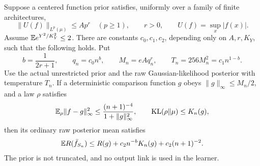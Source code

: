\begin{theorem}
\label{thm:raw-tail-oracle}
Suppose a centered function prior satisfies, uniformly over a family
of finite architectures,
\[
 \|U(f)\|_{L^p(\mu)}\le A p^r\quad(p\ge1),\qquad r>0,
 \qquad U(f)=\sup_x|f(x)|.
\]
Assume $\mathbb E e^{Y^2/K_Y^2}\le2$. There are constants $c_0,c_1,c_2$,
depending only on $A,r,K_Y$, such that the following holds. Put
\[
 b=\frac1{2r+1},\qquad q_n=c_0n^b,\qquad
 M_n=eAq_n^r,\qquad T_n=256M_n^2=c_1n^{1-b}.
\]
Use the actual unrestricted prior and the raw Gaussian-likelihood
posterior with temperature $T_n$. If a deterministic comparison
function $g$ obeys $\|g\|_\infty\le M_n/2$, and a law $\rho$
satisfies
\[
 \mathbb E_\rho\|f-g\|_\infty^2
       \le\frac{(n+1)^{-4}}{1+\|g\|_\infty^2},
 \qquad\operatorname{KL}(\rho\Vert\mu)\le K_n(g),
\]
then its ordinary raw posterior mean satisfies
\begin{equation}
 \mathbb E R(\bar f_{S_n})\le R(g)+c_2 n^{-b}K_n(g)
                                  +c_2(n+1)^{-2}.
 \label{eq:raw-tail-oracle}
\end{equation}
The prior is not truncated, and no output link is used in the learner.
\end{theorem}
